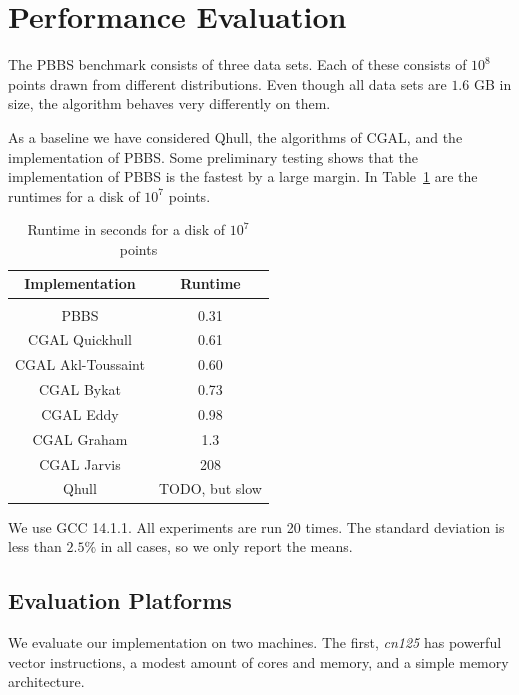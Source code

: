 \section{Performance Evaluation}\label{sec:perf}

The PBBS benchmark consists of three data sets. Each of these consists of
$10^8$ points drawn from different distributions. Even though all data sets
are $1.6$ GB in size, the algorithm behaves very differently on them.

As a baseline we have considered Qhull, the algorithms of CGAL,
and the implementation of PBBS. Some preliminary testing shows that the
implementation of PBBS is the fastest by a large margin. In
Table~\ref{table:reference} are the runtimes for a disk of $10^7$ points.

\begin{table}[ht]
    \caption{Runtime in seconds for a disk of $10^7$ points}
    \label{table:reference}
    \begin{tabular}{c | c }
     Implementation & Runtime \\ 
     \hline \\
     PBBS & 0.31 \\  
     CGAL Quickhull & 0.61 \\
     CGAL Akl-Toussaint & 0.60 \\
     CGAL Bykat & 0.73 \\
     CGAL Eddy & 0.98 \\
     CGAL Graham & 1.3 \\
     CGAL Jarvis & 208 \\
     Qhull & TODO, but slow \\
    \end{tabular}
\end{table}

We use GCC 14.1.1. All experiments are run 20 times. The standard deviation is 
less than $2.5\%$ in all cases, so we only report the means.

\subsection{Evaluation Platforms}

We evaluate our implementation on two machines. The first, \textit{cn125}
has powerful vector instructions, a modest amount of cores and memory, and a 
simple memory architecture. 


